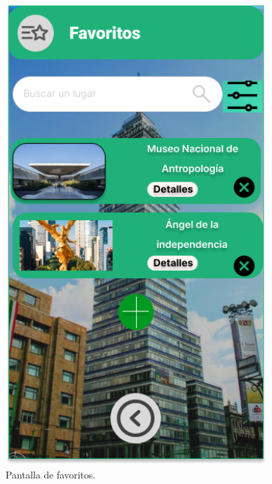 \begin{figure}[htb]
    \centering
    \includegraphics[width=10cm]{pantalla14.png}
    \caption{Pantalla de favoritos.}
    \label{fig:enter-label}
\end{figure}

